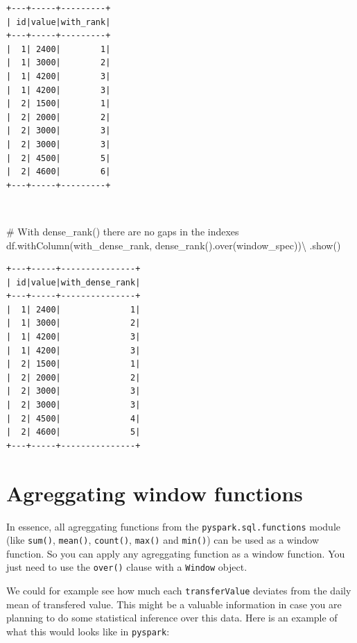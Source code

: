 \documentclass[
  11pt,
  letterpaper,
  DIV=11,
  numbers=noendperiod]{scrreprt}
\newenvironment{Shaded}{\begin{snugshade}}{\end{snugshade}}
\newcommand{\CommentTok}[1]{\textcolor[rgb]{0.37,0.37,0.37}{#1}}
\newcommand{\NormalTok}[1]{\textcolor[rgb]{0.00,0.23,0.31}{#1}}
\newcommand{\OperatorTok}[1]{\textcolor[rgb]{0.37,0.37,0.37}{#1}}
\newcommand{\StringTok}[1]{\textcolor[rgb]{0.13,0.47,0.30}{#1}}
\begin{document}
\begin{verbatim}
+---+-----+---------+
| id|value|with_rank|
+---+-----+---------+
|  1| 2400|        1|
|  1| 3000|        2|
|  1| 4200|        3|
|  1| 4200|        3|
|  2| 1500|        1|
|  2| 2000|        2|
|  2| 3000|        3|
|  2| 3000|        3|
|  2| 4500|        5|
|  2| 4600|        6|
+---+-----+---------+
\end{verbatim}

\begin{verbatim}
                                                                                
\end{verbatim}

\begin{Shaded}
\begin{Highlighting}[]
\CommentTok{\# With dense\_rank() there are no gaps in the indexes}
\NormalTok{df.withColumn(}\StringTok{\textquotesingle{}with\_dense\_rank\textquotesingle{}}\NormalTok{, dense\_rank().over(window\_spec))}\OperatorTok{\textbackslash{}}
\NormalTok{    .show()}
\end{Highlighting}
\end{Shaded}

\begin{verbatim}
+---+-----+---------------+
| id|value|with_dense_rank|
+---+-----+---------------+
|  1| 2400|              1|
|  1| 3000|              2|
|  1| 4200|              3|
|  1| 4200|              3|
|  2| 1500|              1|
|  2| 2000|              2|
|  2| 3000|              3|
|  2| 3000|              3|
|  2| 4500|              4|
|  2| 4600|              5|
+---+-----+---------------+
\end{verbatim}

\hypertarget{agreggating-window-functions}{%
\section{Agreggating window
functions}\label{agreggating-window-functions}}

In essence, all agreggating functions from the
\texttt{pyspark.sql.functions} module (like \texttt{sum()},
\texttt{mean()}, \texttt{count()}, \texttt{max()} and \texttt{min()})
can be used as a window function. So you can apply any agreggating
function as a window function. You just need to use the \texttt{over()}
clause with a \texttt{Window} object.

We could for example see how much each \texttt{transferValue} deviates
from the daily mean of transfered value. This might be a valuable
information in case you are planning to do some statistical inference
over this data. Here is an example of what this would looks like in
\texttt{pyspark}:
\end{document}
